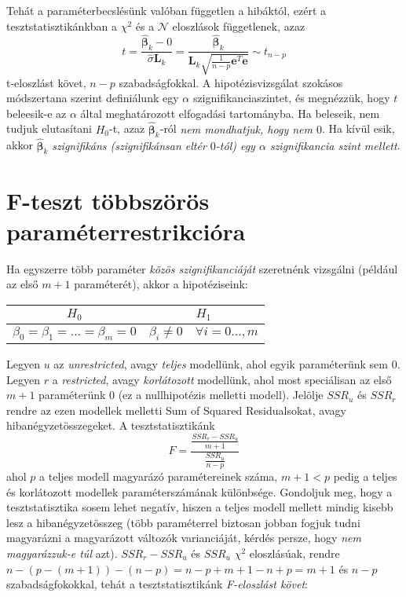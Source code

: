 \documentclass[14p]{report}
\def\pmb{\boldsymbol}
\def\ebeta{\hat{\pmb{\beta}}}
\begin{document}
	Tehát a paraméterbecslésünk valóban független a hibáktól, ezért a tesztstatisztikánkban a $\chi^2$ és a $\mathcal{N}$ eloszlások függetlenek, azaz
	\[
		t = \frac{\ebeta_k - 0}{\widehat{\sigma}\pmb{L}_{k}} = \frac{\ebeta_k}{\pmb{L}_k\sqrt{\frac{1}{n-p}\pmb{e}^T\pmb{e}}} \sim t_{n-p}
	\]
	t-eloszlást követ, $n-p$ szabadságfokkal. A hipotézisvizsgálat szokásos módszertana szerint definiálunk egy $\alpha$ szignifikanciaszintet, és megnézzük, hogy $t$ beleesik-e az $\alpha$ által meghatározott elfogadási tartományba. Ha beleseik, nem tudjuk elutasítani $H_0$-t, azaz $\ebeta_k$-ról \emph{nem mondhatjuk, hogy nem $0$}. Ha kívül esik, akkor $\ebeta_k$ \emph{szignifikáns (szignifikánsan eltér $0$-tól) egy $\alpha$ szignifikancia szint mellett}.
	
	\section{F-teszt többszörös paraméterrestrikcióra}
	Ha egyszerre több paraméter \emph{közös szignifikanciáját} szeretnénk vizsgálni (például az első $m+1$ paraméterét), akkor a hipotéziseink:
	\begin{center}
		\begin{tabular}{|c|c|}
			\hline
			$H_0$ & $H_1$ \\
			\hline
			$\beta_0 = \beta_1 = \dots = \beta_m = 0$ & $\beta_i \ne 0\quad \forall i = 0 \dots,m$ \\
			\hline
		\end{tabular}
	\end{center}
	Legyen $u$ az \emph{unrestricted}, avagy \emph{teljes} modellünk, ahol egyik paraméterünk sem $0$. Legyen $r$ a \emph{restricted}, avagy \emph{korlátozott} modellünk, ahol most speciálisan az első $m+1$ paraméterünk $0$ (ez a nullhipotézis melletti modell). Jelölje $SSR_u$ és $SSR_r$ rendre az ezen modellek melletti Sum of Squared Residualsokat, avagy hibanégyzetösszegeket. A tesztstatisztikánk
	\[
		F = \frac{\frac{SSR_r - SSR_u}{m+1}}{\frac{SSR_u}{n-p}}
	\]
	ahol $p$ a teljes modell magyarázó paramétereinek száma, $m+1 < p$ pedig a teljes és korlátozott modellek paraméterszámának különbsége. Gondoljuk meg, hogy a tesztstatisztika sosem lehet negatív, hiszen a teljes modell mellett mindig kisebb lesz a hibanégyzetösszeg (több paraméterrel biztosan jobban fogjuk tudni magyarázni a magyarázott változók varianciáját, kérdés persze, hogy \emph{nem magyarázzuk-e túl} azt).
	$SSR_r - SSR_u$ és $SSR_u$ $\chi^2$ eloszlásúak, rendre $n-(p-(m+1))-(n-p) = n-p+m+1-n+p = m+1$ és $n-p$ szabadságfokokkal, tehát a tesztstatisztikánk \emph{F-eloszlást követ}:
	
\end{document}

